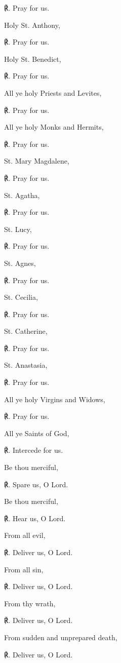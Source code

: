 \begin{multicols}{2}
℟. Pray for us.\par\noindent
Holy St. Anthony,\par
℟. Pray for us.\par\noindent
Holy St. Benedict,\par
℟. Pray for us.\par\noindent
All ye holy Priests and Levites,\par
℟. Pray for us.\par\noindent
All ye holy Monks and Hermits,\par
℟. Pray for us.\par\noindent
St. Mary Magdalene,\par
℟. Pray for us.\par\noindent
St. Agatha,\par
℟. Pray for us.\par\noindent
St. Lucy,\par
℟. Pray for us.\par\noindent
St. Agnes,\par
℟. Pray for us.\par\noindent
St. Cecilia,\par
℟. Pray for us.\par\noindent
St. Catherine,\par
℟. Pray for us.\par\noindent
St. Anastasia,\par
℟. Pray for us.\par\noindent
All ye holy Virgins and Widows,\par
℟. Pray for us.\par\noindent
All ye Saints of God,\par
℟. Intercede for us.\par\noindent
Be thou merciful,\par
℟. Spare us, O Lord.\par\noindent
Be thou merciful,\par
℟. Hear us, O Lord.\par\noindent
From all evil,\par
℟. Deliver us, O Lord.\par\noindent
From all sin,\par
℟. Deliver us, O Lord.\par\noindent
From thy wrath,\par
℟. Deliver us, O Lord.\par\noindent
From sudden and unprepared death,\par
℟. Deliver us, O Lord.\par\noindent

\end{multicols}
